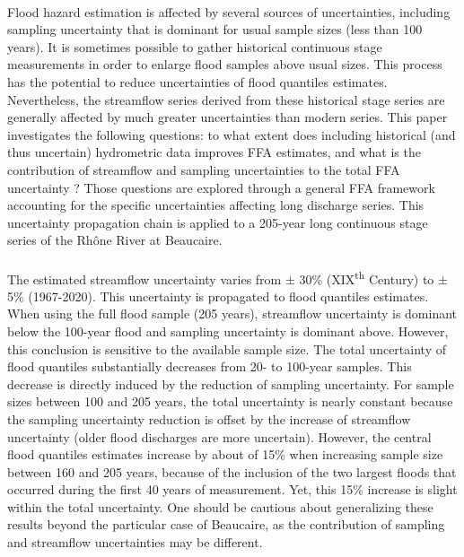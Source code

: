 \documentclass[11pt]{article}
\begin{document}
    \paragraph{} Flood hazard estimation is affected by several sources of uncertainties, including sampling uncertainty that is dominant for usual sample sizes (less than 100 years). It is sometimes possible to gather historical continuous stage measurements in order to enlarge flood samples above usual sizes. This process has the potential to reduce uncertainties of flood quantiles estimates. Nevertheless, the streamflow series derived from these historical stage series are generally affected by much greater uncertainties than modern series. This paper investigates the following questions: to what extent does including historical (and thus uncertain) hydrometric data improves FFA estimates, and what is the contribution of streamflow and sampling uncertainties to the total FFA uncertainty ? Those questions are explored through a general FFA framework accounting for the specific uncertainties affecting long discharge series. This uncertainty propagation chain is applied to a 205-year long continuous stage series of the Rhône River at Beaucaire.

    \paragraph{} The estimated streamflow uncertainty varies from $\pm$ 30\% (XIX\textsuperscript{th} Century) to $\pm$ 5\% (1967-2020). This uncertainty is propagated to flood quantiles estimates. When using the full flood sample (205 years), streamflow uncertainty is dominant below the 100-year flood and sampling uncertainty is dominant above. However, this conclusion is sensitive to the available sample size. The total uncertainty of flood quantiles substantially decreases from 20- to 100-year samples. This decrease is directly induced by the reduction of sampling uncertainty. For sample sizes between 100 and 205 years, the total uncertainty is nearly constant because the sampling uncertainty reduction is offset by the increase of streamflow uncertainty (older flood discharges are more uncertain). However, the central flood quantiles estimates increase by about of 15\% when increasing sample size between 160 and 205 years, because of the inclusion of the two largest floods that occurred during the first 40 years of measurement. Yet, this 15\% increase is slight within the total uncertainty. One should be cautious about generalizing these results beyond the particular case of Beaucaire, as the contribution of sampling and streamflow uncertainties may be different.
\end{document}
